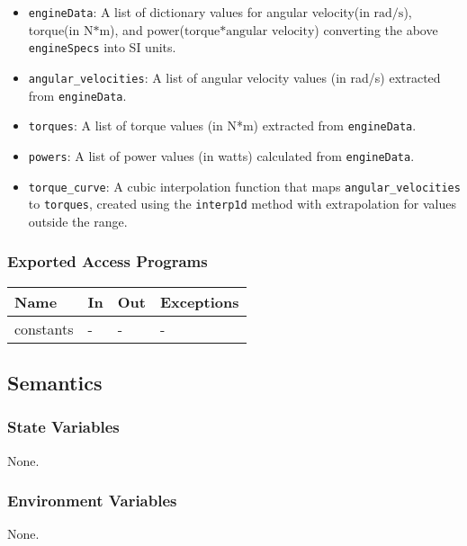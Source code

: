 \documentclass[12pt, titlepage]{article}
\begin{document}
\begin{itemize}
    {"rpm": 3600, "torque": 13.5}]
  \item \texttt{engineData}: A list of dictionary values for angular velocity(in $\text{rad/s}$), torque(in $\text{N*m}$), and power($\text{torque*angular velocity}$) converting the above \texttt{engineSpecs} into SI units.
  \item \texttt{angular\_velocities}: A list of angular velocity values (in rad/s) extracted from \texttt{engineData}.
  \item \texttt{torques}: A list of torque values (in N*m) extracted from \texttt{engineData}.
  \item \texttt{powers}: A list of power values (in watts) calculated from \texttt{engineData}.
  \item \texttt{torque\_curve}: A cubic interpolation function that maps \texttt{angular\_velocities} to \texttt{torques}, created using the \texttt{interp1d} method with extrapolation for values outside the range.
  
\end{itemize}


\subsubsection{Exported Access Programs}

\begin{center}
\begin{tabular}{p{2cm} p{4cm} p{4cm} p{2cm}}
\hline
\textbf{Name} & \textbf{In} & \textbf{Out} & \textbf{Exceptions} \\
\hline
constants & - & - & - \\
\hline
\end{tabular}
\end{center}

\subsection{Semantics}

\subsubsection{State Variables}

None.

\subsubsection{Environment Variables}

None.
\end{document}

